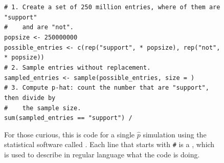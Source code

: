 \begin{figure}[h]
\texttt{\# 1.\ Create a set of 250 million entries,
where \pewsolarparpercent{} of them are "support" \\
\#\ \ \ \ and \pewsolarparpercentcomplement{} are "not". \\
pop\us{}size <- 250000000 \\
possible\_entries <- c(rep("support", \pewsolarparprop{} * pop\us{}size), rep("not", \pewsolarparpropcomplement{} * pop\us{}size))
\\[3mm]
\# 2.\ Sample \pewsolarpollsize{} entries without replacement. \\
sampled\_entries <- sample(possible\_entries, size = \pewsolarpollsize{}) \\[3mm]
\# 3.\ Compute p-hat:~count the number that are "support",
then divide by \\
\#\ \ \ \ the sample size. \\
sum(sampled\_entries == "support") / \pewsolarpollsize{}}
\caption{For those curious, this is code for
    a single $\hat{p}$ simulation using the
    statistical software called \R{}.
    Each line that starts with \texttt{\#} is a
    ,
    which is used to describe in regular language what the
    code is doing.}
\label{solarPollSimulationCodeR}
\end{figure}

